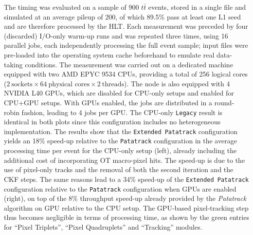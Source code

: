 \documentclass{webofc}
\begin{document}
The timing was evaluated on a sample of 900 $t\bar{t}$ events, stored in a single file and simulated at an average pileup of 200, of which 89.5\% pass at least one L1 seed and are therefore processed by the HLT.
Each measurement was preceded by four (discarded) I/O-only warm-up runs and was repeated three times, using 16 parallel jobs, each independently processing the full event sample; input files were pre-loaded into the operating system cache beforehand to emulate real data-taking conditions.
The measurement was carried out on a dedicated machine equipped with two AMD EPYC 9534 CPUs, providing a total of 256 logical cores ($2~\text{sockets} \times 64~\text{physical cores} \times 2~\text{threads}$).
The node is also equipped with 4 NVIDIA L40 GPUs, which are disabled for CPU-only setups and enabled for CPU+GPU setups.
With GPUs enabled, the jobs are distributed in a round-robin fashion, leading to 4 jobs per GPU.
The CPU-only \texttt{Legacy} result is identical in both plots since this configuration includes no heterogeneous implementation.
The results show that the \texttt{Extended Patatrack} configuration yields an 18\% speed-up relative to the \texttt{Patatrack} configuration in the average processing time per event for the CPU-only setup (left), already including the additional cost of incorporating OT macro-pixel hits.
The speed-up is due to the use of pixel-only tracks and the removal of both the second iteration and the CKF steps.
The same reasons lead to a 34\% speed-up of the \texttt{Extended Patatrack} configuration relative to the \texttt{Patatrack} configuration when GPUs are enabled (right), on top of the 8\% throughput speed-up already provided by the \textit{Patatrack} algorithm on GPU relative to the CPU setup.
The GPU-based pixel-tracking step thus becomes negligible in terms of processing time, as shown by the green entries for ``Pixel Triplets'', ``Pixel Quadruplets'' and ``Tracking'' modules. \par
%
\end{document}
